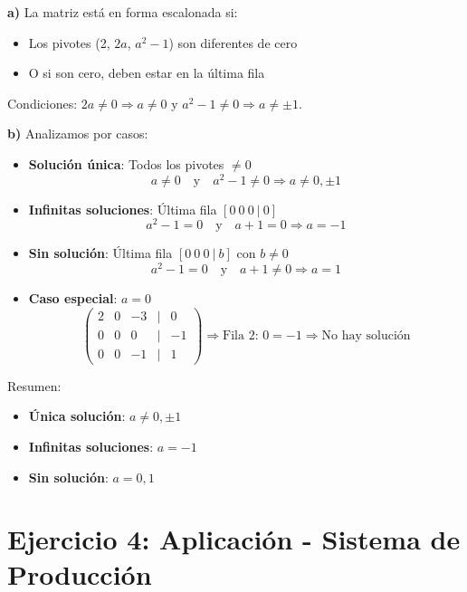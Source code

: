\documentclass[11pt]{article}
\begin{document}
\begin{tcolorbox}[colback=green1!10, colframe=green1, title=Solución]
\textbf{a)} La matriz está en forma escalonada si:
\begin{itemize}
    \item Los pivotes (2, $2a$, $a^2-1$) son diferentes de cero
    \item O si son cero, deben estar en la última fila
\end{itemize}
Condiciones: $2a \neq 0 \Rightarrow a \neq 0$ y $a^2 - 1 \neq 0 \Rightarrow a \neq \pm 1$.

\textbf{b)} Analizamos por casos:

\begin{itemize}
    \item \textbf{Solución única}: Todos los pivotes $\neq 0$
    \[
    a \neq 0 \quad \text{y} \quad a^2 - 1 \neq 0 \Rightarrow a \neq 0, \pm 1
    \]
    
    \item \textbf{Infinitas soluciones}: Última fila $[0\ 0\ 0\ |\ 0]$
    \[
    a^2 - 1 = 0 \quad \text{y} \quad a + 1 = 0 \Rightarrow a = -1
    \]
    
    \item \textbf{Sin solución}: Última fila $[0\ 0\ 0\ |\ b]$ con $b \neq 0$
    \[
    a^2 - 1 = 0 \quad \text{y} \quad a + 1 \neq 0 \Rightarrow a = 1
    \]
    
    \item \textbf{Caso especial}: $a = 0$
    \[
    \begin{pmatrix}
    2 & 0 & -3 & | & 0 \\
    0 & 0 & 0 & | & -1 \\
    0 & 0 & -1 & | & 1
    \end{pmatrix}
    \Rightarrow \text{Fila 2: } 0 = -1 \Rightarrow \text{No hay solución}
    \]
\end{itemize}

Resumen:
\begin{itemize}
    \item \textbf{Única solución}: $a \neq 0, \pm 1$
    \item \textbf{Infinitas soluciones}: $a = -1$
    \item \textbf{Sin solución}: $a = 0, 1$
\end{itemize}
\end{tcolorbox}

\section*{Ejercicio 4: Aplicación - Sistema de Producción}
\end{document}
